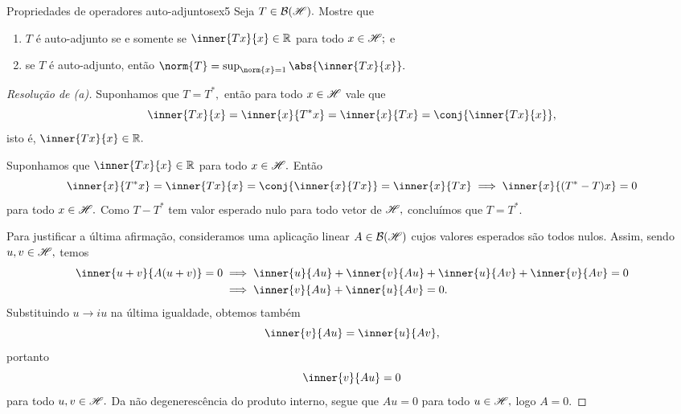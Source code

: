 \begin{exercício}{Propriedades de operadores auto-adjuntos}{ex5}
    Seja \(T \in \mathcal{B}(\mathscr{H}).\) Mostre que
    \begin{enumerate}[label=(\alph*)]
      \item \(T\) é auto-adjunto se e somente se \(\inner{Tx}{x} \in \mathbb{R}\) para todo \(x \in \mathscr{H};\) e
      \item se \(T\) é auto-adjunto, então \(\norm{T} = \sup_{\norm{x} = 1} \abs{\inner{Tx}{x}}.\)
    \end{enumerate}
\end{exercício}
\begin{proof}[Resolução de (a)]
  Suponhamos que \(T = T^*,\) então para todo \(x \in \mathscr{H}\) vale que
  \begin{equation*}
    \inner{Tx}{x} = \inner{x}{T^*x} = \inner{x}{Tx} = \conj{\inner{Tx}{x}},
  \end{equation*}
  isto é, \(\inner{Tx}{x} \in \mathbb{R}.\)

  Suponhamos que \(\inner{Tx}{x} \in \mathbb{R}\) para todo \(x \in \mathscr{H}.\) Então
  \begin{equation*}
    \inner{x}{T^*x} = \inner{Tx}{x} = \conj{\inner{x}{Tx}} = \inner{x}{Tx} \implies \inner{x}{(T^* - T)x} = 0
  \end{equation*}
  para todo \(x \in \mathscr{H}.\) Como \(T - T^*\) tem valor esperado nulo para todo vetor de \(\mathscr{H},\) concluímos que \(T = T^*.\)

  Para justificar a última afirmação, consideramos uma aplicação linear \(A \in \mathcal{B}(\mathscr{H})\) cujos valores esperados são todos nulos. Assim, sendo \(u, v \in \mathscr{H},\) temos
  \begin{align*}
    \inner{u + v}{A(u + v)} = 0 &\implies \inner{u}{Au} + \inner{v}{Au} + \inner{u}{Av} + \inner{v}{Av} = 0\\
                                &\implies \inner{v}{Au} + \inner{u}{Av} = 0.
  \end{align*}
  Substituindo \(u \to iu\) na última igualdade, obtemos também
  \begin{equation*}
    \inner{v}{Au} = \inner{u}{Av},
  \end{equation*}
  portanto
  \begin{equation*}
    \inner{v}{Au} = 0
  \end{equation*}
  para todo \(u, v \in \mathscr{H}.\) Da não degenerescência do produto interno, segue que \(Au = 0\) para todo \(u \in \mathscr{H},\) logo \(A = 0.\)
\end{proof}
